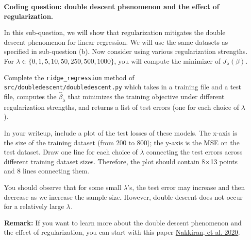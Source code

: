 \item {} \textbf{Coding question: double descent phenomenon and the effect of regularization. }

In this sub-question, we will show that regularization mitigates the double descent phenomenon for linear regression. We will use the same datasets as specified in sub-question (b). Now consider using various regularization strengths. For $\lambda\in \{0, 1, 5, 10, 50, 250, 500, 1000\}$, you will compute the minimizer of $J_\lambda(\beta).$ 

Complete the \texttt{ridge\_regression} method of \texttt{src/doubledescent/doubledescent.py} which takes in a training file and a test file, computes the $\hat{\beta}_\lambda$ that minimizes the training objective under different regularization strengths, and returns a list of test errors (one for each choice of $\lambda$).

In your writeup, include a plot of the test losses of these models. The x-axis is the size of the training dataset (from 200 to 800); the y-axis is the MSE on the test dataset. Draw one line for each choice of $\lambda$ connecting the test errors across different training dataset sizes. Therefore, the plot should contain 8$\times$13 points and 8 lines connecting them. 

You should observe that for some small $\lambda$'s, the test error may increase and then decrease as we increase the sample size. However, double descent does not occur for a relatively large $\lambda$. 

\textbf{Remark:} If you want to learn more about the double descent phenomenon and the effect of regularization, you can start with this paper \href{https://arxiv.org/abs/2003.01897}{Nakkiran, et al. 2020}.